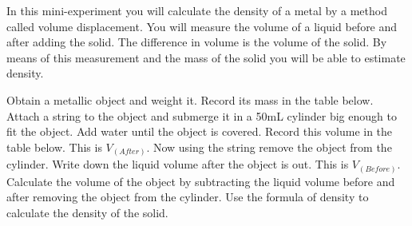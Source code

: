 \documentclass[main.tex]{subfiles}
\begin{document}
\newpage
 \vspace{0.2cm}{\large \bfseries 3. Density of a solid}
In this mini-experiment you will calculate the density of a metal by a method called volume displacement. You will measure the volume of a liquid before and after adding the solid. The difference in volume is the volume of the solid. By means of this measurement and the mass of the solid you will be able to estimate density. 
\begin{steps}
    \newstep[] Obtain a metallic object and weight it. Record its mass in the table below.
        \newstep[]  Attach a string to the object and submerge it in a 50mL cylinder big enough to fit the object. 
        \newstep[]  Add water until the object is covered. Record this volume in the table below. This is $V_{(After)}$.  
         \newstep[] Now using the string remove the object from the cylinder. Write down the liquid volume after the object is out. This is $V_{(Before)}$.
      \newstep[] Calculate the volume of the object by subtracting the liquid volume before and after removing the object from the cylinder.
       \newstep[] Use the formula of density to calculate the density of the solid.     
\end{steps}
\end{document}

